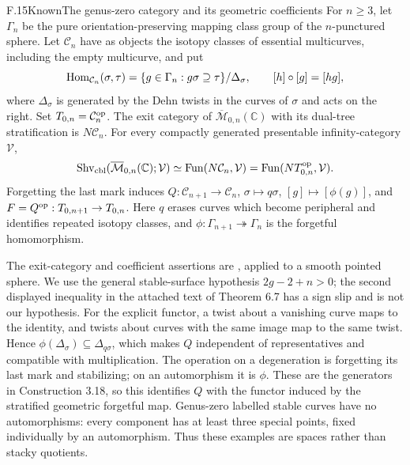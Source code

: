 \begin{claim}{F.15}{Known}{The genus-zero category and its geometric coefficients}
For $n\geq3$, let $\Gamma_n$ be the pure orientation-preserving mapping class group of the $n$-punctured sphere. Let $\mathcal C_n$ have as objects the isotopy classes of essential multicurves, including the empty multicurve, and put
\[
 \mathrm{Hom}_{\mathcal C_n}(\sigma,\tau)
 =\{g\in\Gamma_n:g\sigma\supseteq\tau\}/\Delta_\sigma,
 \qquad [h]\circ[g]=[hg],
\]
where $\Delta_\sigma$ is generated by the Dehn twists in the curves of $\sigma$ and acts on the right. Set $T_{0,n}=\mathcal C_n^{\mathrm{op}}$. The exit category of $\overline{\mathcal M}_{0,n}(\mathbb C)$ with its dual-tree stratification is $N\mathcal C_n$. For every compactly generated presentable infinity-category $\mathcal V$,
\[
 \mathrm{Shv}_{\mathrm{cbl}}(\overline{\mathcal M}_{0,n}(\mathbb C);\mathcal V)
 \simeq\mathrm{Fun}(N\mathcal C_n,\mathcal V)
 =\mathrm{Fun}(NT_{0,n}^{\mathrm{op}},\mathcal V).
\]
Forgetting the last mark induces $Q:\mathcal C_{n+1}\to\mathcal C_n$, $\sigma\mapsto q\sigma$, $[g]\mapsto[\phi(g)]$, and $F=Q^{\mathrm{op}}:T_{0,n+1}\to T_{0,n}$. Here $q$ erases curves which become peripheral and identifies repeated isotopy classes, and $\phi:\Gamma_{n+1}\twoheadrightarrow\Gamma_n$ is the forgetful homomorphism.
\end{claim}
The exit-category and coefficient assertions are \citet[Construction 3.18, Proposition 3.23, Corollary 6.6, and Theorem 6.7]{EFJansen2023}, applied to a smooth pointed sphere. We use the general stable-surface hypothesis $2g-2+n>0$; the second displayed inequality in the attached text of Theorem 6.7 has a sign slip and is not our hypothesis. For the explicit functor, a twist about a vanishing curve maps to the identity, and twists about curves with the same image map to the same twist. Hence $\phi(\Delta_\sigma)\subseteq\Delta_{q\sigma}$, which makes $Q$ independent of representatives and compatible with multiplication. The operation on a degeneration is forgetting its last mark and stabilizing; on an automorphism it is $\phi$. These are the generators in Construction 3.18, so this identifies $Q$ with the functor induced by the stratified geometric forgetful map. Genus-zero labelled stable curves have no automorphisms: every component has at least three special points, fixed individually by an automorphism. Thus these examples are spaces rather than stacky quotients.

